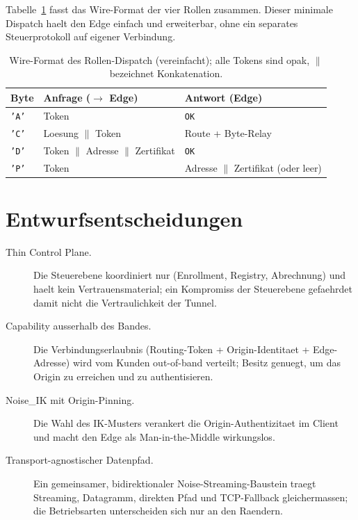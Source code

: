Tabelle~\ref{tab:dispatch} fasst das Wire-Format der vier Rollen zusammen.
Dieser minimale Dispatch haelt den Edge einfach und erweiterbar, ohne ein
separates Steuerprotokoll auf eigener Verbindung.

\begin{table}[t]
  \centering
  \caption{Wire-Format des Rollen-Dispatch (vereinfacht); alle Tokens sind opak,
  $\|$ bezeichnet Konkatenation.}
  \label{tab:dispatch}
  \begin{tabular}{lll}
    \toprule
    Byte & Anfrage ($\rightarrow$ Edge) & Antwort (Edge) \\
    \midrule
    \texttt{'A'} & Token & \texttt{OK} \\
    \texttt{'C'} & Loesung $\|$ Token & Route + Byte-Relay \\
    \texttt{'D'} & Token $\|$ Adresse $\|$ Zertifikat & \texttt{OK} \\
    \texttt{'P'} & Token & Adresse $\|$ Zertifikat (oder leer) \\
    \bottomrule
  \end{tabular}
\end{table}

\section{Entwurfsentscheidungen}
\label{sec:arch-entscheidungen}

\begin{description}
  \item[Thin Control Plane.] Die Steuerebene koordiniert nur (Enrollment,
    Registry, Abrechnung) und haelt kein Vertrauensmaterial; ein Kompromiss der
    Steuerebene gefaehrdet damit nicht die Vertraulichkeit der Tunnel.
  \item[Capability ausserhalb des Bandes.] Die Verbindungserlaubnis (Routing-Token
    + Origin-Identitaet + Edge-Adresse) wird vom Kunden out-of-band verteilt;
    Besitz genuegt, um das Origin zu erreichen und zu authentisieren.
  \item[Noise\_IK mit Origin-Pinning.] Die Wahl des IK-Musters verankert die
    Origin-Authentizitaet im Client und macht den Edge als Man-in-the-Middle
    wirkungslos.
  \item[Transport-agnostischer Datenpfad.] Ein gemeinsamer, bidirektionaler
    Noise-Streaming-Baustein traegt Streaming, Datagramm, direkten Pfad und
    TCP-Fallback gleichermassen; die Betriebsarten unterscheiden sich nur an den
    Raendern.
\end{description}
